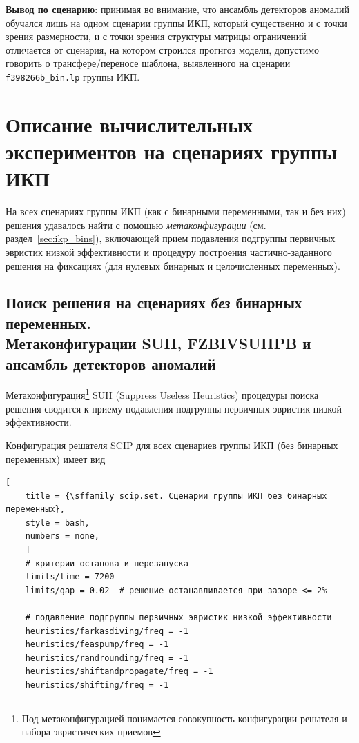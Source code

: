 \documentclass[%
	11pt,
	a4paper,
	utf8,
		]{article}
\begin{document}
\textbf{Вывод по сценарию}: принимая во внимание, что ансамбль детекторов аномалий обучался лишь на одном сценарии группы ИКП, который существенно и с точки зрения размерности, и с точки зрения структуры матрицы ограничений отличается от сценария, на котором строился прогнгоз модели, допустимо говорить о трансфере/переносе шаблона, выявленного на сценарии \texttt{f398266b\_bin.lp} группы ИКП.




\section{Описание вычислительных экспериментов на сценариях группы ИКП}\label{sec:ikp}

На всех сценариях группы ИКП (как с бинарными переменными, так и без них) решения удавалось найти с помощью \emph{метаконфигурации} (см. раздел~\ref{sec:ikp_bins}), включающей прием подавления подгруппы первичных эвристик низкой эффективности и процедуру построения частично-заданного решения на фиксациях (для нулевых бинарных и целочисленных переменных). 

\subsection{Поиск решения на сценариях \emph{без} бинарных переменных. \\Метаконфигурации SUH,  FZBIVSUHPB и ансамбль детекторов аномалий}

Метаконфигурация\footnote{Под метаконфигурацией понимается совокупность конфигурации решателя и набора эвристических приемов} SUH (Suppress Useless Heuristics) процедуры поиска решения сводится к приему подавления подгруппы первичных эвристик низкой эффективности.


Конфигурация решателя SCIP для всех сценариев группы ИКП (без бинарных переменных) имеет вид
\begin{lstlisting}[
	title = {\sffamily scip.set. Сценарии группы ИКП без бинарных переменных},
	style = bash,
	numbers = none,
	]
	# критерии останова и перезапуска
	limits/time = 7200
	limits/gap = 0.02  # решение останавливается при зазоре <= 2%
	
	# подавление подгруппы первичных эвристик низкой эффективности
	heuristics/farkasdiving/freq = -1
	heuristics/feaspump/freq = -1
	heuristics/randrounding/freq = -1
	heuristics/shiftandpropagate/freq = -1
	heuristics/shifting/freq = -1
\end{lstlisting}
\end{document}
